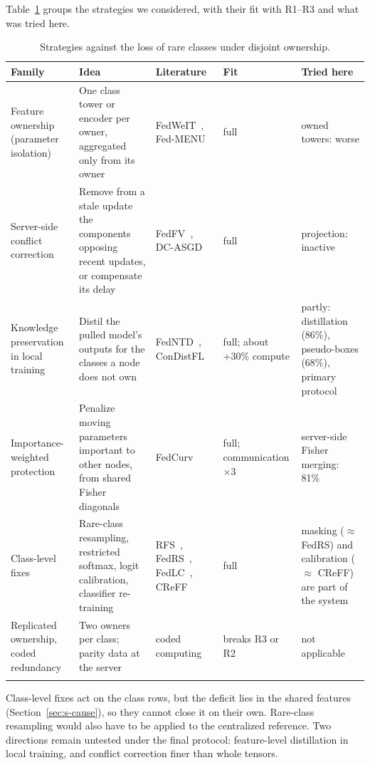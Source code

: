 \documentclass[pdflatex,sn-mathphys-num]{sn-jnl}
\begin{document}
Table~\ref{tab:s-lit} groups the strategies we considered, with their fit with R1--R3 and what was tried here.

\begin{table}[h]
\caption{Strategies against the loss of rare classes under disjoint ownership.}\label{tab:s-lit}
\footnotesize
\setlength{\tabcolsep}{3pt}
\begin{tabular*}{\textwidth}{@{\extracolsep\fill}>{\raggedright\arraybackslash}p{}>{\raggedright\arraybackslash}p{}>{\raggedright\arraybackslash}p{}>{\raggedright\arraybackslash}p{}>{\raggedright\arraybackslash}p{}}
\toprule
Family & Idea & Literature & Fit & Tried here \\
\midrule
Feature ownership (parameter isolation) & One class tower or encoder per owner, aggregated only from its owner & FedWeIT~\cite{yoon2021fedweit}, Fed-MENU~\cite{xu2023fedmenu} & full & owned towers: worse \\
Server-side conflict correction & Remove from a stale update the components opposing recent updates, or compensate its delay & FedFV~\cite{wang2021fedfv}, DC-ASGD~\cite{zheng2017dcasgd} & full & projection: inactive \\
Knowledge preservation in local training & Distil the pulled model's outputs for the classes a node does not own & FedNTD~\cite{lee2022fedntd}, ConDistFL~\cite{wang2024condistfl} & full; about +30\% compute & partly: distillation (86\%), pseudo-boxes (68\%), primary protocol \\
Importance-weighted protection & Penalize moving parameters important to other nodes, from shared Fisher diagonals & FedCurv~\cite{shoham2019fedcurv} & full; communication $\times3$ & server-side Fisher merging: 81\% \\
Class-level fixes & Rare-class resampling, restricted softmax, logit calibration, classifier re-training & RFS~\cite{gupta2019lvis}, FedRS~\cite{li2021fedrs}, FedLC~\cite{zhang2022fedlc}, CReFF~\cite{shang2022creff} & full & masking ($\approx$ FedRS) and calibration ($\approx$ CReFF) are part of the system \\
Replicated ownership, coded redundancy & Two owners per class; parity data at the server & coded computing~\cite{prakash2021coded} & breaks R3 or R2 & not applicable \\
\botrule
\end{tabular*}
\end{table}

Class-level fixes act on the class rows, but the deficit lies in the shared features (Section~\ref{sec:s-cause}), so they cannot close it on their own. Rare-class resampling would also have to be applied to the centralized reference. Two directions remain untested under the final protocol: feature-level distillation in local training, and conflict correction finer than whole tensors.
\end{document}
